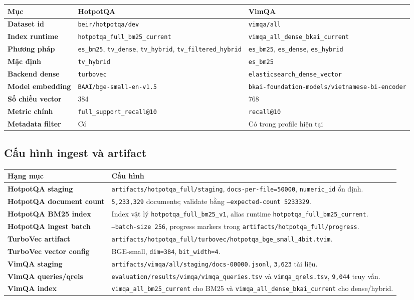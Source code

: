 \documentclass[11pt,a4paper]{article}
\begin{document}
\small
\begin{tabularx}{\textwidth}{>{\bfseries}p{} Y Y}
\toprule
Mục & HotpotQA & VimQA \\
\midrule
Dataset id & \texttt{beir/hotpotqa/dev} & \texttt{vimqa/all} \\
Index runtime & \texttt{hotpotqa\_full\_bm25\_current} & \texttt{vimqa\_all\_dense\_bkai\_current} \\
Phương pháp & \texttt{es\_bm25}, \texttt{tv\_dense}, \texttt{tv\_hybrid}, \texttt{tv\_filtered\_hybrid} & \texttt{es\_bm25}, \texttt{es\_dense}, \texttt{es\_hybrid} \\
Mặc định & \texttt{tv\_hybrid} & \texttt{es\_bm25} \\
Backend dense & \texttt{turbovec} & \texttt{elasticsearch\_dense\_vector} \\
Model embedding & \texttt{BAAI/bge-small-en-v1.5} & \texttt{bkai-foundation-models/vietnamese-bi-encoder} \\
Số chiều vector & 384 & 768 \\
Metric chính & \texttt{full\_support\_recall@10} & \texttt{recall@10} \\
Metadata filter & Có & Có trong profile hiện tại \\
\bottomrule
\end{tabularx}
\normalsize

\subsection{Cấu hình ingest và artifact}

\begin{tabularx}{\textwidth}{>{\bfseries}p{} Y}
\toprule
Hạng mục & Cấu hình \\
\midrule
HotpotQA staging & \texttt{artifacts/hotpotqa\_full/staging}, \texttt{docs-per-file=50000}, \texttt{numeric\_id} ổn định. \\
HotpotQA document count & \texttt{5,233,329} documents; validate bằng \texttt{--expected-count 5233329}. \\
HotpotQA BM25 index & Index vật lý \texttt{hotpotqa\_full\_bm25\_v1}, alias runtime \texttt{hotpotqa\_full\_bm25\_current}. \\
HotpotQA ingest batch & \texttt{--batch-size 256}, progress markers trong \texttt{artifacts/hotpotqa\_full/progress}. \\
TurboVec artifact & \texttt{artifacts/hotpotqa\_full/turbovec/hotpotqa\_bge\_small\_4bit.tvim}. \\
TurboVec vector config & BGE-small, \texttt{dim=384}, \texttt{bit\_width=4}. \\
VimQA staging & \texttt{artifacts/vimqa/all/staging/docs-00000.jsonl}, \texttt{3,623} tài liệu. \\
VimQA queries/qrels & \texttt{evaluation/results/vimqa/vimqa\_queries.tsv} và \texttt{vimqa\_qrels.tsv}, \texttt{9,044} truy vấn. \\
VimQA index & \texttt{vimqa\_all\_bm25\_current} cho BM25 và \texttt{vimqa\_all\_dense\_bkai\_current} cho dense/hybrid. \\
\bottomrule
\end{tabularx}
\end{document}
